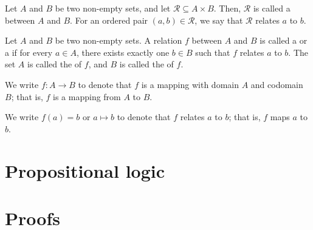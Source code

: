 \begin{defn}
Let $ A $ and $ B $ be two non-empty sets, and let $ \mathcal{R}\subseteq A\times B $. Then, $ \mathcal{R} $ is called a  between $ A $ and $ B $. For an ordered pair $ (a,b)\in\mathcal{R} $, we say that $ \mathcal{R} $ relates $ a $ to $ b $.
\end{defn}

\begin{defn}
Let $ A $ and $ B $ be two non-empty sets. A relation $ f $ between $ A $ and $ B $ is called a  or a  if for every $ a\in A $, there exists exactly one $ b\in B $ such that $ f $ relates $ a $ to $ b $. The set $ A $ is called the  of $ f $, and $ B $ is called the  of $ f $.

We write $ f:A\to B $ to denote that $ f $ is a mapping with domain $ A $ and codomain $ B $; that is, $ f $ is a mapping from $ A $ to $ B $.

We write $ f(a)=b $ or $ a\mapsto b $ to denote that $ f $ relates $ a $ to $ b $; that is, $ f $ maps $ a $ to $ b $.
\end{defn}

\section{Propositional logic}

\section{Proofs}